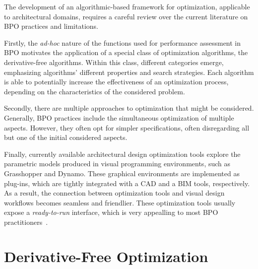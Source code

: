\cleardoublepage
\label{chap:back}

	The development of an algorithmic-based framework for optimization, applicable to architectural domains, requires a careful review over the current literature on \ac{BPO} practices and limitations. 
	
	Firstly, the \textit{ad-hoc} nature of the functions used for performance assessment in \ac{BPO} motivates the application of a special class of optimization algorithms, the derivative-free algorithms. Within this class, different categories emerge, emphasizing algorithms' different properties and search strategies. Each algorithm is able to potentially increase the effectiveness of an optimization process, depending on the characteristics of the considered problem. 
	
	Secondly, there are multiple approaches to optimization that might be considered. Generally, \ac{BPO} practices include the simultaneous optimization of multiple aspects. However, they often opt for simpler  specifications, often disregarding all but one of the initial considered aspects. 

	Finally, currently available architectural design optimization tools explore the parametric models produced in visual programming environments, such as Grasshopper and Dynamo. These graphical environments are implemented as plug-ins, which are tightly integrated with a \ac{CAD} and a \ac{BIM} tools, respectively. As a result, the connection between optimization tools and visual design workflows becomes seamless and friendlier. These optimization tools usually expose a \textit{ready-to-run} interface, which is very appealling to most \ac{BPO} practitioners~\cite{Cichocka2017SURVEY}.
	
\section{Derivative-Free Optimization}
\label{sec:dfo}

